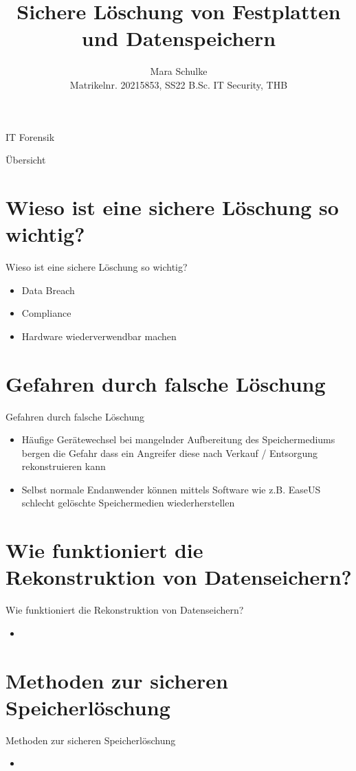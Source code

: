 \documentclass{beamer}
\title{Sichere Löschung von Festplatten und Datenspeichern}
\author{Mara Schulke\\\tiny{Matrikelnr. 20215853, SS22 B.Sc. IT Security, THB}}
\begin{document}
\begin{frame}
	IT Forensik
	\vspace{1em}
	\titlepage
\end{frame}

\begin{frame}{Übersicht}
	\tableofcontents
\end{frame}

\section{Wieso ist eine sichere Löschung so wichtig?}
\begin{frame}{Wieso ist eine sichere Löschung so wichtig?}
	\begin{itemize}
		\item Data Breach
		\item Compliance
		\item Hardware wiederverwendbar machen
	\end{itemize}
\end{frame}

\section{Gefahren durch falsche Löschung}
\begin{frame}{Gefahren durch falsche Löschung}
	\begin{itemize}
		\item Häufige Gerätewechsel bei mangelnder Aufbereitung des Speichermediums
			bergen die Gefahr dass ein Angreifer diese nach Verkauf / Entsorgung
			rekonstruieren kann
		\item Selbst normale Endanwender können mittels Software wie z.B.
			EaseUS schlecht gelöschte Speichermedien wiederherstellen 
	\end{itemize}
\end{frame}

\section{Wie funktioniert die Rekonstruktion von Datenseichern?}
\begin{frame}{Wie funktioniert die Rekonstruktion von Datenseichern?}
	\begin{itemize}
		\item 
	\end{itemize}
\end{frame}

\section{Methoden zur sicheren Speicherlöschung}
\begin{frame}{Methoden zur sicheren Speicherlöschung}
	\begin{itemize}
		\item 
	\end{itemize}
\end{frame}
\end{document}
